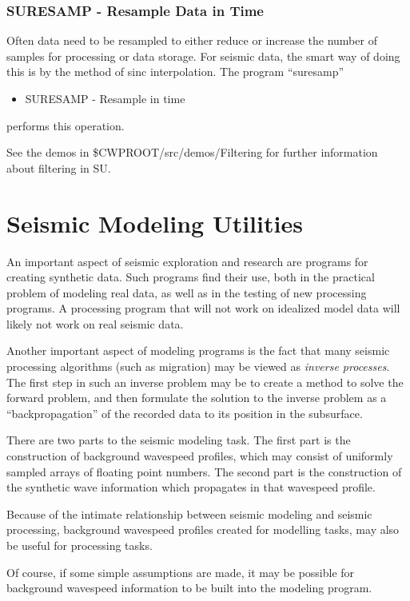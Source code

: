 {{{{{{{\subsection{SURESAMP - Resample Data in Time}
Often data need to be resampled to either reduce or increase
the number of samples for processing or data storage.
For seismic data, the smart way of doing this is by the 
method of sinc interpolation.
The program ``suresamp''
\begin{itemize}
\item SURESAMP - Resample in time 
\end{itemize}
performs this operation.

See the demos in \$CWPROOT/src/demos/Filtering   for further information
about filtering in SU.

\chapter{Seismic Modeling Utilities}

An important aspect of seismic exploration and research are programs
for creating synthetic data. Such programs find their use,
both in the practical problem of modeling real data, as well
as in the testing of new processing programs. A processing program
that will not work on idealized model data will likely not work
on real seismic data.

Another important aspect of modeling programs is the fact that many
seismic processing algorithms (such as migration) may be viewed
as {\em inverse processes\/}.  The first step in such an inverse 
problem may be to create a method to solve the forward problem,
and then formulate the solution to the inverse
problem as a ``backpropagation'' of the recorded data to its position
in the subsurface.

There are two parts to the seismic modeling task. The first part is the
construction of background wavespeed profiles, which may consist
of uniformly sampled arrays of floating point numbers.
The second part is the construction of the synthetic wave
information which propagates in that wavespeed profile.

Because of the intimate relationship between seismic modeling and
seismic processing, background wavespeed profiles created for
modelling tasks, may also be useful for processing tasks.

Of course, if some simple assumptions are made, it may be possible
for background wavespeed information to be built into the modeling
program.

}}}}}}}
